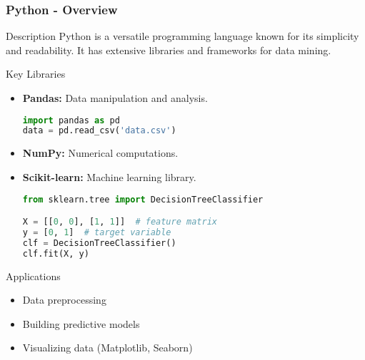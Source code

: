 \documentclass[aspectratio=169]{beamer}
\begin{document}
\begin{frame}[fragile]
    \frametitle{Python - Overview}
    \begin{block}{Description}
        Python is a versatile programming language known for its simplicity and readability. It has extensive libraries and frameworks for data mining.
    \end{block}
    
    \begin{block}{Key Libraries}
        \begin{itemize}
            \item \textbf{Pandas:} Data manipulation and analysis.
            \begin{lstlisting}[language=Python]
import pandas as pd
data = pd.read_csv('data.csv')
            \end{lstlisting}
            \item \textbf{NumPy:} Numerical computations.
            \item \textbf{Scikit-learn:} Machine learning library.
            \begin{lstlisting}[language=Python]
from sklearn.tree import DecisionTreeClassifier

X = [[0, 0], [1, 1]]  # feature matrix
y = [0, 1]  # target variable
clf = DecisionTreeClassifier()
clf.fit(X, y)
            \end{lstlisting}
        \end{itemize}
    \end{block}

    \begin{block}{Applications}
        \begin{itemize}
            \item Data preprocessing
            \item Building predictive models
            \item Visualizing data (Matplotlib, Seaborn)
        \end{itemize}
    \end{block}
\end{frame}
\end{document}
